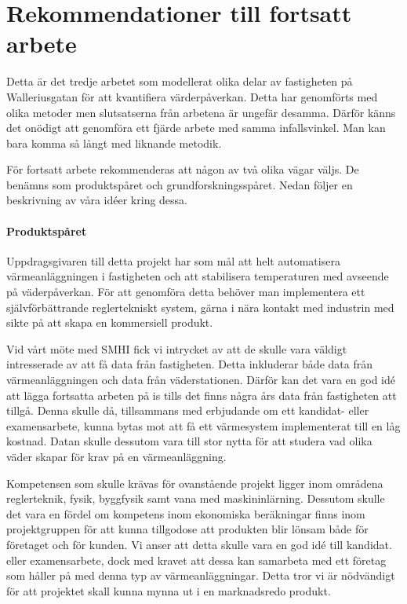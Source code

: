 \section{Rekommendationer till fortsatt arbete}

Detta är det tredje arbetet som modellerat olika delar av fastigheten på Walleriusgatan för att
kvantifiera värderpåverkan. Detta har genomförts med olika metoder men slutsatserna från arbetena är ungefär desamma.
Därför känns det onödigt att genomföra ett fjärde arbete med samma infallsvinkel. Man kan bara komma så
långt med liknande metodik.

För fortsatt arbete rekommenderas att någon av två olika vägar väljs. De benämns
som produktspåret och grundforskningsspåret. Nedan följer en beskrivning av våra idéer kring dessa.

\paragraph{Produktspåret}
Uppdragsgivaren till detta projekt har som mål att helt automatisera värmeanläggningen i fastigheten och att stabilisera
temperaturen med avseende på väderpåverkan. För att genomföra detta behöver man implementera ett självförbättrande
reglertekniskt system, gärna i nära kontakt med industrin med sikte på att skapa en kommersiell produkt. 

Vid vårt möte med SMHI fick vi intrycket av att de skulle vara väldigt intresserade av att få data från fastigheten.
Detta inkluderar både data från värmeanläggningen och data från väderstationen. Därför kan det vara
en god idé att lägga fortsatta arbeten på is tills det finns några års data från fastigheten att tillgå.
Denna skulle då, tillsammans med erbjudande om ett kandidat- eller examensarbete, kunna bytas mot att få ett värmesystem implementerat till en låg kostnad. Datan skulle dessutom vara till stor nytta för att studera vad olika väder skapar för
krav på en värmeanläggning. 

Kompetensen som skulle krävas för ovanstående projekt ligger inom områdena reglerteknik, fysik, byggfysik samt vana med maskininlärning.
Dessutom skulle det vara en fördel om kompetens inom ekonomiska beräkningar finns inom projektgruppen för att
kunna tillgodose att produkten blir lönsam både för företaget och för kunden. Vi anser att detta skulle vara en god
idé till kandidat. eller examensarbete, dock med kravet att dessa kan samarbeta med
ett företag som håller på med denna typ av värmeanläggningar. Detta tror vi är nödvändigt för att projektet skall kunna mynna ut i en marknadsredo produkt.


